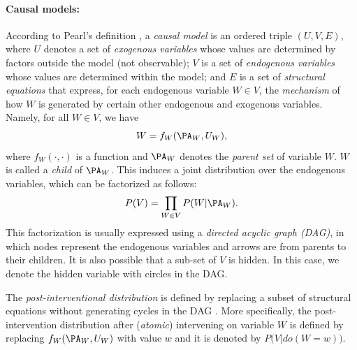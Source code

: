 \documentclass[letterpaper]{article} %
\theoremstyle{definition}%
\theoremstyle{definition}
\newcommand{\defi}{\emph}
\begin{document}
\paragraph{Causal models:}
According to Pearl's definition \cite{pearl2009causality}, a \defi{causal model} is an ordered triple $(U, V, E)$, where $U$ denotes a set of \emph{exogenous variables} whose values are determined by factors outside the model (not observable); $V$ is a set of \emph{endogenous variables} whose values are determined within the model; and $E$ is a set of \emph{structural equations} that express, for each endogenous variable $W \in V$, the \emph{mechanism} of how $W$ is generated by certain other endogenous and exogenous variables. Namely, for all $W\in V$, we have
$$
W = f_W(\PA_W, U_W),
$$
 where $f_W(\cdot,\cdot)$ is a function and $\PA_W$ denotes the \defi{parent set} of variable $W$. $W$ is called a \emph{child} of $\PA_W$.
This induces a joint distribution over the endogenous variables, which can be factorized as follows:
$$
P(V) = \prod_{W \in V} P(W|\PA_W).
$$
This factorization is usually expressed using a \defi{directed acyclic graph (DAG)}, in which nodes represent the endogenous variables and arrows are from parents to their children.
It is also possible that a sub-set of $V$ is hidden. In this case, we denote the hidden variable with circles in the DAG.

The \defi{post-interventional distribution} is defined by replacing a subset of structural equations without generating cycles in the DAG \cite{pearl2009causality}. More specifically, the post-intervention distribution after (\textit{atomic}) intervening on variable $W$ is defined by replacing $f_W(\PA_W, U_W)$ with value $w$ and it is denoted by
$
P\big(V| do(W = w)\big).
$
\end{document}
